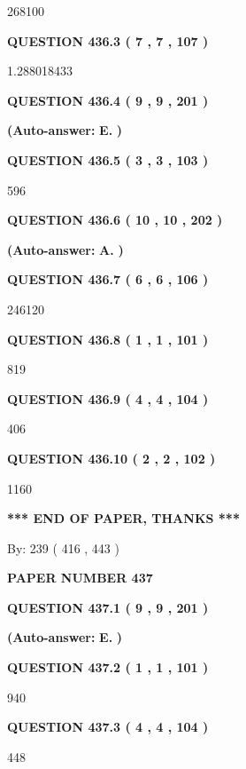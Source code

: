 \documentclass{ctexart}
\begin{document}
268100
  
  
{\textbf{\large{QUESTION
436.3 
 ( 7 , 7 , 107 )
}}}

1.288018433
  
  
{\textbf{\large{QUESTION
436.4 
 ( 9 , 9 , 201 )
}}}
 
 
{\textbf{(Auto-answer:}}
{\textbf{\large{
E.}}}
{\textbf{)}}
 
 
  
  
{\textbf{\large{QUESTION
436.5 
 ( 3 , 3 , 103 )
}}}

596
  
  
{\textbf{\large{QUESTION
436.6 
 ( 10 , 10 , 202 )
}}}
 
 
{\textbf{(Auto-answer:}}
{\textbf{\large{
A.}}}
{\textbf{)}}
 
 
  
  
{\textbf{\large{QUESTION
436.7 
 ( 6 , 6 , 106 )
}}}

246120
  
  
{\textbf{\large{QUESTION
436.8 
 ( 1 , 1 , 101 )
}}}

819
  
  
{\textbf{\large{QUESTION
436.9 
 ( 4 , 4 , 104 )
}}}

406
  
  
{\textbf{\large{QUESTION
436.10 
 ( 2 , 2 , 102 )
}}}

1160
   
   
   
   
\vspace{1.0in} 
{\textbf{\large{ *** END OF PAPER, THANKS *** }}} 
   
   
\hspace{1.0in} By: 
 239 ( 416 ,  443 )
   
   
   
   
\newpage 
\setcounter{page}{ 
   437001 } 
   
   
 {\textbf{ \Large{ PAPER NUMBER  437  }}}
   
   
   
   
  
  
{\textbf{\large{QUESTION
437.1 
 ( 9 , 9 , 201 )
}}}
 
 
{\textbf{(Auto-answer:}}
{\textbf{\large{
E.}}}
{\textbf{)}}
 
 
  
  
{\textbf{\large{QUESTION
437.2 
 ( 1 , 1 , 101 )
}}}

940
  
  
{\textbf{\large{QUESTION
437.3 
 ( 4 , 4 , 104 )
}}}

448
  
\end{document}
